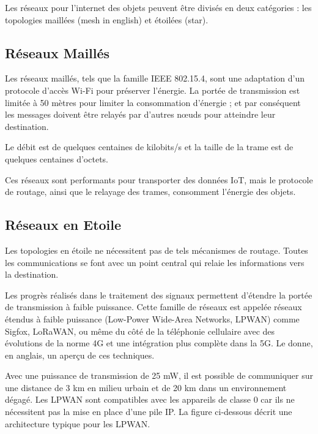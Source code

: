 Les réseaux pour l’internet des objets peuvent être divisés en deux catégories : les topologies maillées (mesh in english) et étoilées (star).


\subsection*{Réseaux Maillés}

Les réseaux maillés, tels que la famille IEEE 802.15.4,  sont une adaptation d’un protocole d’accès Wi-Fi pour préserver l’énergie. La portée de transmission est limitée à 50 mètres pour limiter la consommation d'énergie ; et par conséquent les messages doivent être relayés par d’autres nœuds pour atteindre leur destination.

Le débit est de quelques centaines de kilobits/s et la taille de la trame est de quelques centaines d’octets. 

Ces réseaux sont performants pour transporter des données IoT, mais le protocole de routage, ainsi que le relayage des trames, consomment l’énergie des objets.

\subsection*{Réseaux en Etoile}

Les topologies en étoile ne nécessitent pas de tels mécanismes de routage. Toutes les communications se font avec un point central qui relaie les informations vers la destination.

Les progrès réalisés dans le traitement des signaux permettent d’étendre la portée de transmission à faible puissance. Cette famille de réseaux est appelée réseaux étendus à faible puissance (Low-Power Wide-Area Networks, LPWAN) comme Sigfox, LoRaWAN, ou même du côté de la téléphonie cellulaire avec des évolutions de la norme 4G et une intégration plus complète dans la 5G. Le  donne, en anglais, un aperçu de ces techniques.


    \vspace{1em}

Avec une puissance de transmission de 25 mW, il est possible de communiquer sur une distance de 3 km en milieu urbain et de 20 km dans un environnement dégagé. Les LPWAN sont compatibles avec les appareils de classe 0 car ils ne nécessitent pas la mise en place d’une pile IP. La figure ci-dessous décrit une architecture typique pour les LPWAN.

